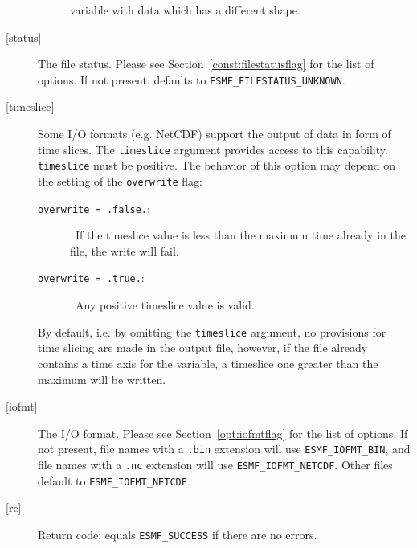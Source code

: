 \begin{description}
\begin{sloppypar}
\begin{description}
        variable with data which has a different shape.
      \end{description}
      \end{sloppypar}
     \item[{[status]}]
      \begin{sloppypar}
      The file status. Please see Section~\ref{const:filestatusflag} for
      the list of options. If not present, defaults to
      {\tt ESMF\_FILESTATUS\_UNKNOWN}.
      \end{sloppypar}
     \item[{[timeslice]}]
      \begin{sloppypar}
      Some I/O formats (e.g. NetCDF) support the output of data in form of
      time slices. The {\tt timeslice} argument provides access to this
      capability. {\tt timeslice} must be positive. The behavior of this
      option may depend on the setting of the {\tt overwrite} flag:
      \begin{description}
      \item[{\tt overwrite = .false.}:]\ If the timeslice value is
      less than the maximum time already in the file, the write will fail.
      \item[{\tt overwrite = .true.}:]\ Any positive timeslice value is valid.
      \end{description}
      By default, i.e. by omitting the {\tt timeslice} argument, no
      provisions for time slicing are made in the output file,
      however, if the file already contains a time axis for the variable,
      a timeslice one greater than the maximum will be written.
      \end{sloppypar}
     \item[{[iofmt]}]
       \begin{sloppypar}
      The I/O format.  Please see Section~\ref{opt:iofmtflag} for the list
      of options. If not present, file names with a {\tt .bin} extension will
      use {\tt ESMF\_IOFMT\_BIN}, and file names with a {\tt .nc} extension
      will use {\tt ESMF\_IOFMT\_NETCDF}.  Other files default to
      {\tt ESMF\_IOFMT\_NETCDF}.
       \end{sloppypar}
     \item[{[rc]}] 
       Return code; equals {\tt ESMF\_SUCCESS} if there are no errors.
     \end{description}
  
\setlength{\parskip}{\oldparskip}
\setlength{\parindent}{\oldparindent}
\setlength{\baselineskip}{\oldbaselineskip}

